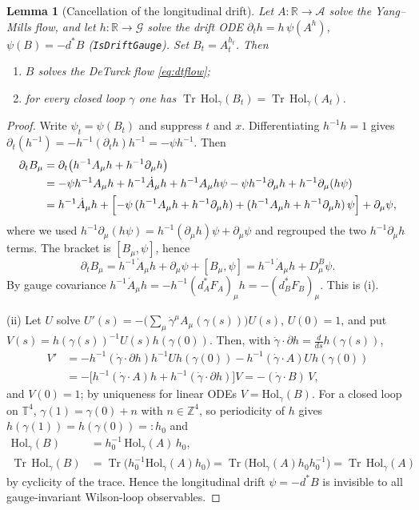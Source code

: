 \documentclass[11pt,a4paper]{article}
\newtheorem{lemma}[theorem]{Lemma}
\theoremstyle{definition}
\theoremstyle{remark}
\newcommand{\R}{\mathbb{R}}
\newcommand{\Z}{\mathbb{Z}}
\newcommand{\T}{\mathbb{T}}
\newcommand{\Tr}{\operatorname{Tr}}
\newcommand{\CalA}{\mathcal{A}}
\newcommand{\CalG}{\mathcal{G}}
\begin{document}
\begin{lemma}[Cancellation of the longitudinal drift]\label{lem:drift}
Let $A:\R\to\CalA$ solve the Yang--Mills flow, and let $h:\R\to\CalG$ solve the drift ODE $\partial_th=h\,\psi(A^h)$, $\psi(B)=-d^*B$ (\texttt{IsDriftGauge}). Set $B_t=A_t^{h_t}$. Then
\begin{enumerate}
\item[(i)] $B$ solves the DeTurck flow \eqref{eq:dtflow};
\item[(ii)] for every closed loop $\gamma$ one has $\Tr\,\mathrm{Hol}_\gamma(B_t)=\Tr\,\mathrm{Hol}_\gamma(A_t)$.
\end{enumerate}
\end{lemma}
\begin{proof}
Write $\psi_t=\psi(B_t)$ and suppress $t$ and $x$. Differentiating $h^{-1}h=1$ gives $\partial_t(h^{-1})=-h^{-1}(\partial_th)h^{-1}=-\psi h^{-1}$. Then
\begin{align*}
\partial_tB_\mu&=\partial_t\bigl(h^{-1}A_\mu h+h^{-1}\partial_\mu h\bigr)\\
&=-\psi h^{-1}A_\mu h+h^{-1}\dot A_\mu h+h^{-1}A_\mu h\psi-\psi h^{-1}\partial_\mu h+h^{-1}\partial_\mu(h\psi)\\
&=h^{-1}\dot A_\mu h+\Bigl[-\psi\,(h^{-1}A_\mu h+h^{-1}\partial_\mu h)+(h^{-1}A_\mu h+h^{-1}\partial_\mu h)\,\psi\Bigr]+\partial_\mu\psi,
\end{align*}
where we used $h^{-1}\partial_\mu(h\psi)=h^{-1}(\partial_\mu h)\psi+\partial_\mu\psi$ and regrouped the two $h^{-1}\partial_\mu h$ terms. The bracket is $[B_\mu,\psi]$, hence
\begin{equation*}
\partial_tB_\mu=h^{-1}\dot A_\mu h+\partial_\mu\psi+[B_\mu,\psi]=h^{-1}\dot A_\mu h+D^{B}_\mu\psi.
\end{equation*}
By gauge covariance $h^{-1}\dot A_\mu h=-h^{-1}(d_A^*F_A)_\mu h=-(d_B^*F_B)_\mu$. This is (i).

(ii) Let $U$ solve $U'(s)=-\bigl(\sum_\mu\dot\gamma^\mu A_\mu(\gamma(s))\bigr)U(s)$, $U(0)=1$, and put $V(s)=h(\gamma(s))^{-1}U(s)h(\gamma(0))$. Then, with $\dot\gamma\cdot\partial h=\frac{d}{ds}h(\gamma(s))$,
\begin{align*}
V'&=-h^{-1}(\dot\gamma\!\cdot\!\partial h)h^{-1}Uh(\gamma(0))-h^{-1}(\dot\gamma\!\cdot\!A)Uh(\gamma(0))\\
&=-\bigl[h^{-1}(\dot\gamma\!\cdot\!A)h+h^{-1}(\dot\gamma\!\cdot\!\partial h)\bigr]V=-(\dot\gamma\!\cdot\!B)\,V,
\end{align*}
and $V(0)=1$; by uniqueness for linear ODEs $V=\mathrm{Hol}_\gamma(B)$. For a closed loop on $\T^4$, $\gamma(1)=\gamma(0)+n$ with $n\in\Z^4$, so periodicity of $h$ gives $h(\gamma(1))=h(\gamma(0))=:h_0$ and
\begin{align*}
\mathrm{Hol}_\gamma(B)&=h_0^{-1}\,\mathrm{Hol}_\gamma(A)\,h_0,\\
\Tr\,\mathrm{Hol}_\gamma(B)&=\Tr\bigl(h_0^{-1}\mathrm{Hol}_\gamma(A)h_0\bigr)=\Tr\bigl(\mathrm{Hol}_\gamma(A)h_0h_0^{-1}\bigr)=\Tr\,\mathrm{Hol}_\gamma(A)\end{align*}
by cyclicity of the trace. Hence the longitudinal drift $\psi=-d^*B$ is invisible to all gauge-invariant Wilson-loop observables.
\end{proof}
\end{document}
